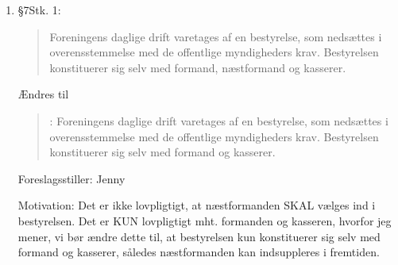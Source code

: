 \documentclass[a4paper,12pt,danish]{article}
\begin{document}
\begin{enumerate}
\item \S7Stk. 1:

    \begin{quote}
Foreningens daglige drift varetages af en bestyrelse, som nedsættes i overensstemmelse med de offentlige myndigheders krav. Bestyrelsen konstituerer sig selv med formand, næstformand og kasserer.
    \end{quote}

    Ændres til
        \begin{quote}:
Foreningens daglige drift varetages af en bestyrelse, som nedsættes i overensstemmelse med de offentlige myndigheders krav. Bestyrelsen konstituerer sig selv med formand og kasserer.
    \end{quote}

    Foreslagsstiller: Jenny

    Motivation: Det er ikke lovpligtigt, at næstformanden SKAL vælges ind i bestyrelsen. Det er KUN lovpligtigt mht. formanden og kasseren, hvorfor jeg mener, vi bør ændre dette til, at bestyrelsen kun konstituerer sig selv med formand og kasserer, således næstformanden kan indsuppleres i fremtiden.


\end{enumerate}
\end{document}
